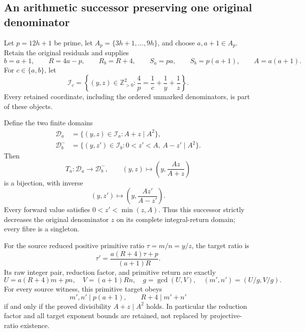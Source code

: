 \subsection{An arithmetic successor preserving one original denominator}
\label{sec:exact-audit-fixed-y}

Let \(p=12h+1\) be prime, let
\(A_p=\{3h+1,\ldots,9h\}\), and choose \(a,a+1\in A_p\).
Retain the original residuals and supplies
\[
 b=a+1,\qquad R=4a-p,\qquad R_b=R+4,\qquad
 S_a=pa,\qquad S_b=p(a+1),\qquad A=a(a+1).
\]
For \(c\in\{a,b\}\), let
\[
 \mathcal I_c=\left\{(y,z)\in\mathbb Z_{>0}^2:
       \frac4p=\frac1c+\frac1y+\frac1z\right\}.
\]
Every retained coordinate, including the ordered unmarked denominators,
is part of these objects.

\begin{theorem}
\label{thm:exact-audit-fixed-y}
Define the two finite domains
\begin{align*}
 \mathcal D_a&=\{(y,z)\in\mathcal I_a:A+z\mid A^2\},\\
 \mathcal D_b^-&=\{(y,z')\in\mathcal I_b:
                       0<z'<A,\ A-z'\mid A^2\}.
\end{align*}
Then
\begin{equation}\label{eq:exact-audit-fixed-y-map}
 T_a:\mathcal D_a\longrightarrow\mathcal D_b^-,\qquad
 (y,z)\longmapsto\left(y,\frac{Az}{A+z}\right)
\end{equation}
is a bijection, with inverse
\begin{equation}\label{eq:exact-audit-fixed-y-inverse}
 (y,z')\longmapsto\left(y,\frac{Az'}{A-z'}\right).
\end{equation}
Every forward value satisfies \(0<z'<\min(z,A)\). Thus this
successor strictly decreases the original denominator \(z\) on its
complete integral-return domain; every fibre is a singleton.

For the source reduced positive primitive ratio \(\tau=m/n=y/z\),
the target ratio is
\begin{equation}\label{eq:exact-audit-fixed-y-ratio}
 \tau'=\frac{a(R+4)\tau+p}{(a+1)R}.
\end{equation}
Its raw integer pair, reduction factor, and primitive return are exactly
\begin{equation}\label{eq:exact-audit-fixed-y-gcd}
 U=a(R+4)m+pn,\quad V=(a+1)Rn,\quad
 g=\gcd(U,V),\quad (m',n')=(U/g,V/g).
\end{equation}
For every source witness, this primitive target obeys
\[
 m',n'\mid p(a+1),\qquad R+4\mid m'+n'
\]
if and only if the proved divisibility \(A+z\mid A^2\) holds.
In particular the reduction factor and all target exponent bounds are
retained, not replaced by projective-ratio existence.
\end{theorem}
